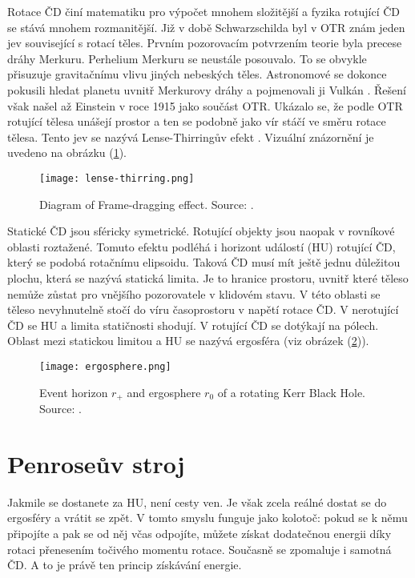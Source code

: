 \documentclass[
	a4paper, %
	10pt, %
	unnumberedsections, %
	twoside, %
]{LTJournalArticle}
\begin{document}
Rotace ČD činí matematiku pro výpočet mnohem složitější a fyzika rotující ČD se stává mnohem rozmanitější. Již v době Schwarzschilda byl v OTR znám jeden jev související s rotací těles. Prvním pozorovacím potvrzením teorie byla precese dráhy Merkuru. Perhelium Merkuru se neustále posouvalo. To se obvykle přisuzuje gravitačnímu vlivu jiných nebeských těles. Astronomové se dokonce pokusili hledat planetu uvnitř Merkurovy dráhy a pojmenovali ji Vulkán \autocite{weinstein2014}. Řešení však našel až Einstein v roce 1915 jako součást OTR. Ukázalo se, že podle OTR rotující tělesa unášejí prostor a ten se podobně jako vír stáčí ve směru rotace tělesa. Tento jev se nazývá Lense-Thirringův efekt \autocite{pfister2007}. Vizuální znázornění je uvedeno na obrázku (\ref{fig:lense-thirring}).

\begin{figure} %
	\texttt{[image: lense-thirring.png]}
	\caption{Diagram of Frame-dragging effect. Source: \textcite{zhang2024}.}
	\label{fig:lense-thirring}
\end{figure}

Statické ČD jsou sféricky symetrické. Rotující objekty jsou naopak v rovníkové oblasti roztažené. Tomuto efektu podléhá i horizont událostí (HU) rotující ČD, který se podobá rotačnímu elipsoidu. Taková ČD musí mít ještě jednu důležitou plochu, která se nazývá statická limita. Je to hranice prostoru, uvnitř které těleso nemůže zůstat pro vnějšího pozorovatele v klidovém stavu. V této oblasti se těleso nevyhnutelně stočí do víru časoprostoru v napětí rotace ČD. V nerotující ČD se HU a limita statičnosti shodují. V rotující ČD se dotýkají na pólech. Oblast mezi statickou limitou a HU se nazývá ergosféra (viz obrázek (\ref{fig:ergosphere})). 

\begin{figure} %
	\texttt{[image: ergosphere.png]}
	\caption{Event horizon $r_+$ and ergosphere $r_0$ of a rotating Kerr Black Hole. Source: \textcite{scharpf2017}.}
	\label{fig:ergosphere}
\end{figure}

\section{Penroseův stroj}

Jakmile se dostanete za HU, není cesty ven. Je však zcela reálné dostat se do ergosféry a vrátit se zpět. V tomto smyslu funguje jako kolotoč: pokud se k němu připojíte a pak se od něj včas odpojíte, můžete získat dodatečnou energii díky rotaci přenesením točivého momentu rotace. Současně se zpomaluje i samotná ČD. A to je právě ten princip získávání energie. 
\end{document}
